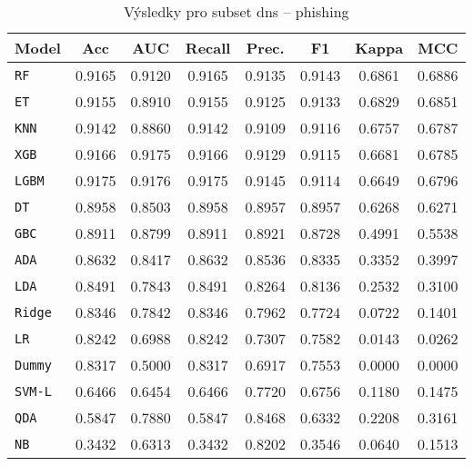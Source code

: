 \begin{table}[H]
  \centering
  \small
  \caption{Výsledky pro subset dns – phishing}
  \begin{tabular}{|l|c|c|c|c|c|c|c|}
    \hline
    \textbf{Model} & \textbf{Acc} & \textbf{AUC} & \textbf{Recall} & \textbf{Prec.} & \textbf{F1} & \textbf{Kappa} & \textbf{MCC} \\
    \hline
    \texttt{RF} & 0.9165 & 0.9120 & 0.9165 & 0.9135 & 0.9143 & 0.6861 & 0.6886 \\
    \texttt{ET} & 0.9155 & 0.8910 & 0.9155 & 0.9125 & 0.9133 & 0.6829 & 0.6851 \\
    \texttt{KNN} & 0.9142 & 0.8860 & 0.9142 & 0.9109 & 0.9116 & 0.6757 & 0.6787 \\
    \texttt{XGB} & 0.9166 & 0.9175 & 0.9166 & 0.9129 & 0.9115 & 0.6681 & 0.6785 \\
    \texttt{LGBM} & 0.9175 & 0.9176 & 0.9175 & 0.9145 & 0.9114 & 0.6649 & 0.6796 \\
    \texttt{DT} & 0.8958 & 0.8503 & 0.8958 & 0.8957 & 0.8957 & 0.6268 & 0.6271 \\
    \texttt{GBC} & 0.8911 & 0.8799 & 0.8911 & 0.8921 & 0.8728 & 0.4991 & 0.5538 \\
    \texttt{ADA} & 0.8632 & 0.8417 & 0.8632 & 0.8536 & 0.8335 & 0.3352 & 0.3997 \\
    \texttt{LDA} & 0.8491 & 0.7843 & 0.8491 & 0.8264 & 0.8136 & 0.2532 & 0.3100 \\
    \texttt{Ridge} & 0.8346 & 0.7842 & 0.8346 & 0.7962 & 0.7724 & 0.0722 & 0.1401 \\
    \texttt{LR} & 0.8242 & 0.6988 & 0.8242 & 0.7307 & 0.7582 & 0.0143 & 0.0262 \\
    \texttt{Dummy} & 0.8317 & 0.5000 & 0.8317 & 0.6917 & 0.7553 & 0.0000 & 0.0000 \\
    \texttt{SVM-L} & 0.6466 & 0.6454 & 0.6466 & 0.7720 & 0.6756 & 0.1180 & 0.1475 \\
    \texttt{QDA} & 0.5847 & 0.7880 & 0.5847 & 0.8468 & 0.6332 & 0.2208 & 0.3161 \\
    \texttt{NB} & 0.3432 & 0.6313 & 0.3432 & 0.8202 & 0.3546 & 0.0640 & 0.1513 \\
    \hline
  \end{tabular}
\end{table}
\vspace{0.5cm}

